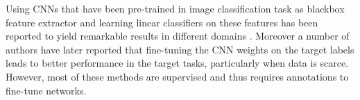Using CNNs that have been pre-trained in image classification task as blackbox
feature extractor and learning linear classifiers on these features has been
reported to yield remarkable results in different domains
\cite{donahue2013decaf}. Moreover a number of authors
\cite{girshick2014rich,chatfield2014bmvc} have later reported that fine-tuning
the CNN weights on the target labels leads to better performance in the target
tasks, particularly when data is scarce. However, most of these methods are
supervised and thus requires annotations to fine-tune networks.